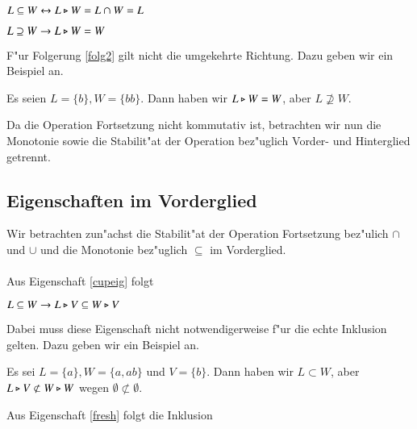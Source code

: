 \vspace{2ex}

\begin{folg}\label{folg1}
$L\subseteq W \leftrightarrow L\triangleright W = L\cap W = L$
\end{folg}

\vspace{2ex}

\begin{folg}\label{folg2}
$L\supseteq W \to L\triangleright W = W$
\end{folg}
F"ur Folgerung \ref{folg2} gilt nicht die umgekehrte Richtung. Dazu geben wir ein Beispiel an.

\vspace{2ex}

\begin{beispiel}
Es seien $L=\{b\}, W=\{bb\}$. Dann haben wir $L\triangleright W = W$, aber $L\not\supseteq W$.
\end{beispiel}

Da die Operation Fortsetzung nicht kommutativ ist, betrachten wir nun die Monotonie sowie die Stabilit"at der Operation bez"uglich Vorder- und Hinterglied getrennt.
\subsection{Eigenschaften im Vorderglied}

Wir betrachten zun"achst die Stabilit"at der Operation Fortsetzung bez"ulich $\cap$ und $\cup$ und die Monotonie bez"uglich $\subseteq$ im Vorderglied.\\\\
Aus Eigenschaft \ref{cupeig} folgt

\vspace{2ex}

\begin{eigen}\label{fresh}
$L\subseteq W \to L\triangleright V \subseteq W \triangleright V$
\end{eigen}
Dabei muss diese Eigenschaft nicht notwendigerweise f"ur die echte Inklusion gelten. Dazu geben wir ein Beispiel an.

\vspace{2ex}

\begin{beispiel}
Es sei $L=\{a\}, W=\{a,ab\}$ und $V=\{b\}$. Dann haben wir $L\subset W$, aber $L\triangleright V \not\subset W\triangleright W$ wegen $\emptyset \not\subset\emptyset$.
\end{beispiel}

Aus Eigenschaft \ref{fresh} folgt die Inklusion

